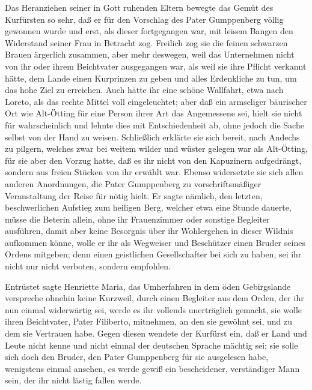 Das Heranziehen seiner in Gott ruhenden Eltern bewegte das Gemüt
des Kurfürsten so sehr, daß er für den Vorschlag des Pater
Gumppenberg völlig gewonnen wurde und erst, als dieser fortgegangen
war, mit leisem Bangen den Widerstand seiner Frau in Betracht zog.
Freilich zog sie die feinen schwarzen Brauen ärgerlich zusammen,
aber mehr deswegen, weil das Unternehmen nicht von ihr oder ihrem
Beichtvater ausgegangen war, als weil sie ihre Pflicht verkannt
hätte, dem Lande einen Kurprinzen zu geben und alles Erdenkliche zu
tun, um das hohe Ziel zu erreichen. Auch hätte ihr eine schöne
Wallfahrt, etwa nach Loreto, als das rechte Mittel voll
eingeleuchtet; aber daß ein \pagenum{[106]} armseliger bäurischer
Ort wie Alt-Ötting für eine Person ihrer Art das Angemessene sei,
hielt sie nicht für wahrscheinlich und lehnte dies mit
Entschiedenheit ab, ohne jedoch die Sache selbst von der Hand zu
weisen. Schließlich erklärte sie sich bereit, nach Andechs zu
pilgern, welches zwar bei weitem wilder und wüster gelegen war als
Alt-Ötting, für sie aber den Vorzug hatte, daß es ihr nicht von den
Kapuzinern aufgedrängt, sondern aus freien Stücken von ihr erwählt
war. Ebenso widersetzte sie sich allen anderen Anordnungen, die
Pater Gumppenberg zu vorschriftsmäßiger Veranstaltung der Reise für
nötig hielt. Er sagte nämlich, den letzten, beschwerlichen Aufstieg
zum heiligen Berg, welcher etwa eine Stunde dauerte, müsse die
Beterin allein, ohne ihr Frauenzimmer oder sonstige Begleiter
ausführen, damit aber keine Besorgnis über ihr Wohlergehen in
dieser Wildnis aufkommen könne, wolle er ihr als Wegweiser und
Beschützer einen Bruder seines Ordens mitgeben; denn einen
geistlichen Gesellschafter bei sich zu haben, sei ihr nicht nur
nicht verboten, sondern empfohlen.

Entrüstet sagte Henriette Maria, das Umherfahren in dem öden
Gebirgslande verspreche ohnehin keine Kurzweil, durch einen
Begleiter aus dem Orden, der ihr nun einmal widerwärtig sei, werde
es ihr vollends unerträglich gemacht, sie wolle ihren Beichtvater,
Pater Filiberto, mitnehmen, an den sie gewöhnt sei, und zu dem sie
Vertrauen habe. Gegen diesen wendete der Kurfürst ein, daß er Land
und Leute nicht kenne und nicht einmal der deutschen Sprache
mächtig sei; sie solle sich doch den Bruder, den Pater Gumppenberg
für sie ausgelesen habe, wenigstens einmal ansehen, es werde gewiß
ein bescheidener, verständiger Mann sein, der ihr nicht lästig
fallen werde.

